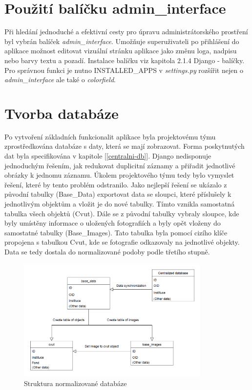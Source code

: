 \newpage

\section{Použití balíčku admin\_interface}

Při hledání jednoduché a efektivní cesty pro úpravu administrátorského prostření byl vybrán balíček \emph{admin\_interface}. Umožňuje superuživateli po přihlášení do aplikace možnost editovat vizuální stránku aplikace jako změnu loga, nadpisu nebo barvy textu a pozadí. Instalace balíčku viz kapitola 2.1.4 Django - balíčky. Pro správnou funkci je nutno INSTALLED\_APPS v \emph{settings.py} rozšířit nejen o \emph{admin\_interface} ale také o \emph{colorfield}.



\section{Tvorba databáze}
\label{tvorba-database}
Po vytvoření základních funkcionalit aplikace byla projektovému týmu zprostředkována databáze s daty, která se mají zobrazovat. Forma poskytnutých dat byla specifikována v kapitole [\ref{centralni-db}]. Django nedisponuje jednoduchým řešením, jak redukovat duplicitní záznamy a přiřadit jednotlivé obrázky k jednomu záznamu. Úkolem projektového týmu tedy bylo vymyslet řešení, které by tento problém odstranilo. Jako nejlepší řešení se ukázalo z původní tabulky (Base\_Data) exportovat data se sloupci, které příslušely k jednotlivým objektům a vložit je do nové tabulky. Tímto vznikla samostatná tabulka všech objektů (Cvut). Dále se z původní tabulky vybraly sloupce, kde byly umístěny informace o uložených fotografiích a byly opět vloženy do samostatné tabulky (Base\_Images). Tato tabulka byla pomocí cizího klíče propojena s tabulkou Cvut, kde se fotografie odkazovaly na jednotlivé objekty. Data se tedy dostala do normalizované podoby podle třetího stupně.

\begin{figure}[H] \centering
    \includegraphics[width=270pt]{./pictures/18-db-diagram-1.PNG}
    \caption[Struktura normalizované databáze]{Struktura normalizované databáze}
	\label{fig:Struktura noramlizované databáze}              
\end{figure}


